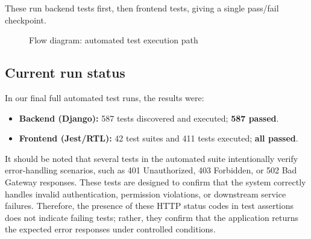 These run backend tests first, then frontend tests, giving a single pass/fail checkpoint.

\begin{figure}[H]
\centering
{}
\caption{Flow diagram: automated test execution path}
\label{fig:test-exec-flow}
\end{figure}

\subsection{Current run status}

In our final full automated test runs, the results were:
\begin{itemize}
	\item \textbf{Backend (Django):} 587 tests discovered and executed; \textbf{587 passed}.
	\item \textbf{Frontend (Jest/RTL):} 42 test suites and 411 tests executed; \textbf{all passed}.
\end{itemize}

It should be noted that several tests in the automated suite intentionally verify error-handling scenarios, such as 401 Unauthorized, 403 Forbidden, or 502 Bad Gateway responses. These tests are designed to confirm that the system correctly handles invalid authentication, permission violations, or downstream service failures. Therefore, the presence of these HTTP status codes in test assertions does not indicate failing tests; rather, they confirm that the application returns the expected error responses under controlled conditions.

